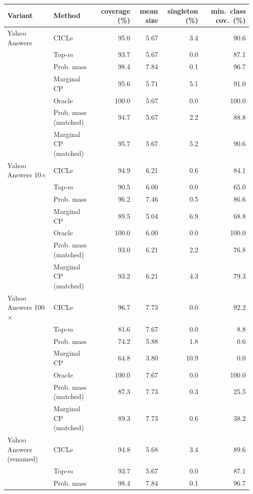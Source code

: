 \begin{tabular}{llrrrr}
\toprule
Variant & Method & coverage (\%) & mean size & singleton (\%) & min.\ class cov.\ (\%) \\
\midrule
Yahoo Answers & CICLe & 95.0 & 5.67 & 3.4 & 90.6 \\
 & Top-$m$ & 93.7 & 5.67 & 0.0 & 87.1 \\
 & Prob. mass & 98.4 & 7.84 & 0.1 & 96.7 \\
 & Marginal CP & 95.6 & 5.71 & 5.1 & 91.0 \\
 & Oracle & 100.0 & 5.67 & 0.0 & 100.0 \\
 & Prob. mass (matched) & 94.7 & 5.67 & 2.2 & 88.8 \\
 & Marginal CP (matched) & 95.7 & 5.67 & 5.2 & 90.6 \\
\addlinespace
Yahoo Answers 10$\times$ & CICLe & 94.9 & 6.21 & 0.6 & 84.1 \\
 & Top-$m$ & 90.5 & 6.00 & 0.0 & 65.0 \\
 & Prob. mass & 96.2 & 7.46 & 0.5 & 86.6 \\
 & Marginal CP & 89.5 & 5.04 & 6.9 & 68.8 \\
 & Oracle & 100.0 & 6.00 & 0.0 & 100.0 \\
 & Prob. mass (matched) & 93.0 & 6.21 & 2.2 & 76.8 \\
 & Marginal CP (matched) & 93.2 & 6.21 & 4.3 & 79.3 \\
\addlinespace
Yahoo Answers 100$\times$ & CICLe & 96.7 & 7.73 & 0.0 & 92.2 \\
 & Top-$m$ & 81.6 & 7.67 & 0.0 & 8.8 \\
 & Prob. mass & 74.2 & 5.88 & 1.8 & 0.6 \\
 & Marginal CP & 64.8 & 3.80 & 10.9 & 0.0 \\
 & Oracle & 100.0 & 7.67 & 0.0 & 100.0 \\
 & Prob. mass (matched) & 87.3 & 7.73 & 0.3 & 25.5 \\
 & Marginal CP (matched) & 89.3 & 7.73 & 0.6 & 38.2 \\
\addlinespace
Yahoo Answers (renamed) & CICLe & 94.8 & 5.68 & 3.4 & 89.6 \\
 & Top-$m$ & 93.7 & 5.67 & 0.0 & 87.1 \\
 & Prob. mass & 98.4 & 7.84 & 0.1 & 96.7 \\

\end{tabular}
